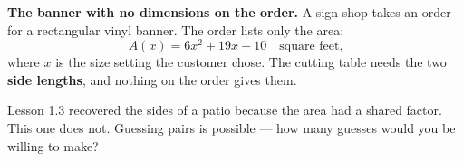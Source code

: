 \documentclass[10pt]{article}
\begin{document}
\boxguard[12]
\begin{hookbox}
\small
\textbf{The banner with no dimensions on the order.} A sign shop takes an order for a rectangular
vinyl banner. The order lists only the area:
\[ A(x) = 6x^2+19x+10 \quad \text{square feet,} \]
where $x$ is the size setting the customer chose. The cutting table needs the two \textbf{side
lengths}, and nothing on the order gives them.

Lesson 1.3 recovered the sides of a patio because the area had a shared factor. This one does not.
Guessing pairs is possible --- how many guesses would you be willing to make?

\\
\\
\end{hookbox}

\vspace{0.10in}
\end{document}
